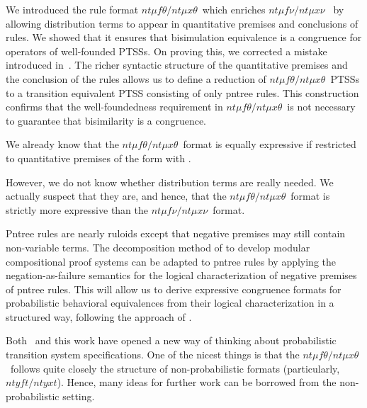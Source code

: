 \documentclass[submission,copyright,creativecommons]{eptcs}
\newcommand{\ntmufnu}{\ensuremath{\textit{nt}\mu\textit{f}\nu}}
\newcommand{\ntmuxnu}{\ensuremath{\textit{nt}\mu\textit{x}\nu}}
\newcommand{\ntmufxnu}{\ensuremath{\ntmufnu\textit{/}\ntmuxnu}}
\newcommand{\ntmuft}{\ensuremath{\textit{nt}\mu\textit{f}\theta}}
\newcommand{\ntmuxt}{\ensuremath{\textit{nt}\mu\textit{x}\theta}}
\newcommand{\ntmufxt}{\ensuremath{\ntmuft\textit{/}\ntmuxt}}
\newcommand{\ntyft}{\ensuremath{\textit{ntyft}}}
\newcommand{\ntyxt}{\ensuremath{\textit{ntyxt}}}
\newcommand{\ntyfxt}{\ensuremath{\ntyft\textit{/}\ntyxt}}
\newcommand{\colorpar}[3]{\colorbox{#1}{\parbox{#2}{#3}}}
\newcommand{\marginremark}[3]{\marginpar{\colorpar{#2}{\linewidth}{\color{#1}#3}}}
\newcommand{\remarkPRD}[1]{\marginremark{darkred}{lightred}{\tiny{[PRD]~ #1}}}
\newcommand{\remarkDG}[1]{\marginremark{darkgreen}{lightyellow}{\tiny{[DG]~ #1}}}
\renewcommand{\remarkDG}[1]{}
\renewcommand{\remarkPRD}[1]{}
\begin{document}
We introduced the rule format \ntmufxt\ which enriches
\ntmufxnu~\cite{DL-fossacs12} by allowing distribution terms to appear
in quantitative premises and conclusions of rules.
We showed that it ensures that bisimulation equivalence is a
congruence for operators of well-founded PTSSs.  On proving this, we
corrected a mistake introduced in~\cite{DL-fossacs12}.
The richer syntactic structure of the quantitative premises and the
conclusion of the rules allows us to define a reduction of
\ntmufxt\ PTSSs to a transition equivalent PTSS consisting of only
pntree rules.
This construction confirms that the well-foundedness requirement in
\ntmufxt\ is not necessary to guarantee that bisimilarity is a
congruence.



We already know that the \ntmufxt\ format is equally expressive if
restricted to quantitative premises of the form  with
.  
\remarkDG{Do you want to say that without loss of expressivity one can restrict  to only  and express  by  ?}\remarkPRD{Not only that, but also that it suffices that  is a rational number (instead of real). BTW, I corrected  by .}\remarkDG{Not required for the paper but just for my understanding: What is the reason that  suffices? Is this following Dedikind-cut argumentation?}
\remarkPRD{Yes. For the case of , we need to introduce an (denumerably) infinite number of rules. (This remark is also for me to remember how is the encoding.)}
However, we do not know whether distribution
terms are really needed.  We actually suspect that they are, and
hence, that the \ntmufxt\ format is strictly more expressive than the
\ntmufxnu\ format. 


Pntree rules are nearly ruloids \cite{BloomIM95:jacm} except that
negative premises may still contain non-variable terms. The decomposition 
method of \cite{Bloom:2004:PFD:963927.963929,Gebler:2012:phml_lt_sos} to develop
modular compositional proof systems can be adapted to pntree
rules by applying the negation-as-failure semantics for the logical characterization of
negative premises of pntree rules.
This will allow us to derive expressive congruence formats for probabilistic behavioral equivalences from their logical characterization in a structured way, following the approach of \cite{Bloom:2004:PFD:963927.963929}.


Both~\cite{DL-fossacs12} and this work have opened a new way of
thinking about probabilistic transition system specifications.  One of the
nicest things is that the \ntmufxt\ follows quite closely the
structure of non-probabilistic formats (particularly, \ntyfxt).
Hence, many ideas for further work can be borrowed from the
non-probabilistic setting.








\end{document}
